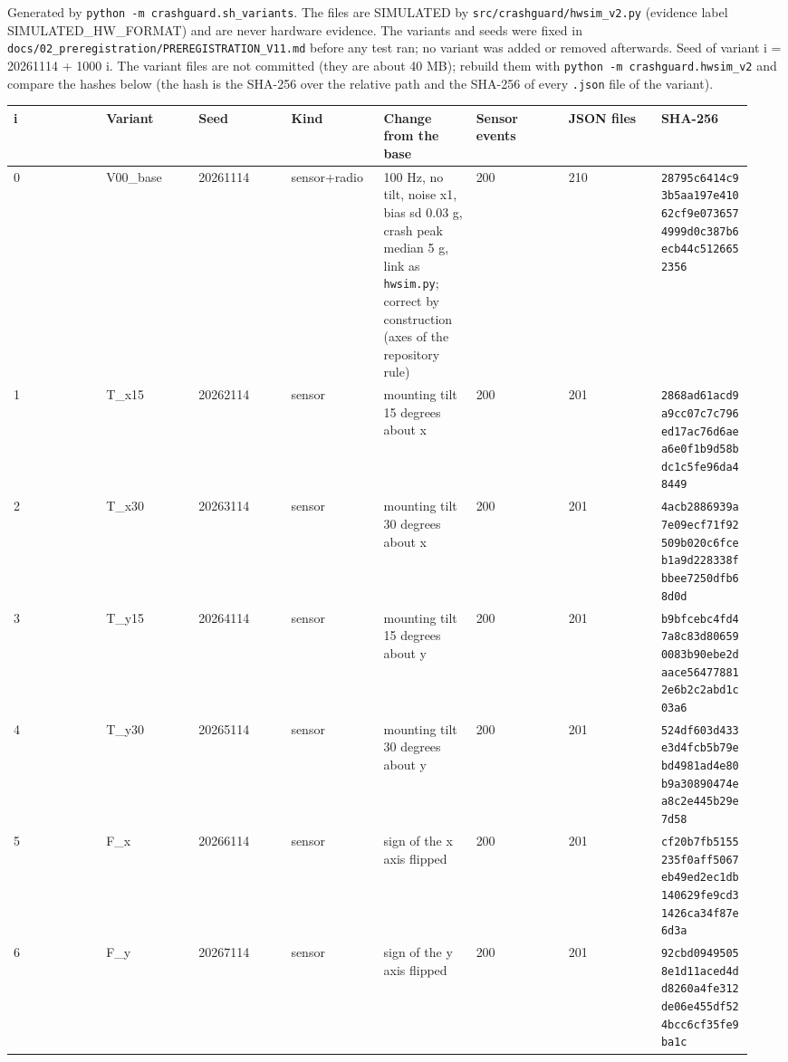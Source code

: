 


Generated by \texttt{python -m crashguard.sh\_variants}. The files are SIMULATED by \texttt{src/crashguard/hwsim\_v2.py} (evidence label SIMULATED\_HW\_FORMAT) and are never hardware evidence. The variants and seeds were fixed in \texttt{docs/02\_preregistration/PREREGISTRATION\_V11.md} before any test ran; no variant was added or removed afterwards. Seed of variant i = 20261114 + 1000 i. The variant files are not committed (they are about 40 MB); rebuild them with \texttt{python -m crashguard.hwsim\_v2} and compare the hashes below (the hash is the SHA-256 over the relative path and the SHA-256 of every \texttt{.json} file of the variant).

{\scriptsize\raggedright
\begin{longtable}{p{0.119\linewidth}p{0.119\linewidth}p{0.119\linewidth}p{0.119\linewidth}p{0.119\linewidth}p{0.119\linewidth}p{0.119\linewidth}p{0.119\linewidth}}
\toprule
i & Variant & Seed & Kind & Change from the base & Sensor events & JSON files & SHA-256 \\
\midrule
\endhead
0 & V00\_base & 20261114 & sensor+radio & 100 Hz, no tilt, noise x1, bias sd 0.03 g, crash peak median 5 g, link as \texttt{hwsim.py}; correct by construction (axes of the repository rule) & 200 & 210 & \texttt{28795c6414c93b5aa197e41062cf9e0736574999d0c387b6ecb44c5126652356} \\
1 & T\_x15 & 20262114 & sensor & mounting tilt 15 degrees about x & 200 & 201 & \texttt{2868ad61acd9a9cc07c7c796ed17ac76d6aea6e0f1b9d58bdc1c5fe96da48449} \\
2 & T\_x30 & 20263114 & sensor & mounting tilt 30 degrees about x & 200 & 201 & \texttt{4acb2886939a7e09ecf71f92509b020c6fceb1a9d228338fbbee7250dfb68d0d} \\
3 & T\_y15 & 20264114 & sensor & mounting tilt 15 degrees about y & 200 & 201 & \texttt{b9bfcebc4fd47a8c83d806590083b90ebe2daace564778812e6b2c2abd1c03a6} \\
4 & T\_y30 & 20265114 & sensor & mounting tilt 30 degrees about y & 200 & 201 & \texttt{524df603d433e3d4fcb5b79ebd4981ad4e80b9a30890474ea8c2e445b29e7d58} \\
5 & F\_x & 20266114 & sensor & sign of the x axis flipped & 200 & 201 & \texttt{cf20b7fb5155235f0aff5067eb49ed2ec1db140629fe9cd31426ca34f87e6d3a} \\
6 & F\_y & 20267114 & sensor & sign of the y axis flipped & 200 & 201 & \texttt{92cbd09495058e1d11aced4dd8260a4fe312de06e455df524bcc6cf35fe9ba1c} \\

\end{longtable}}
